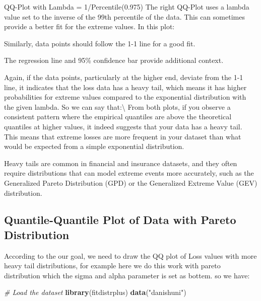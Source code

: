\documentclass[
  12pt,
]{article}
\newenvironment{Shaded}{\begin{snugshade}}{\end{snugshade}}
\newcommand{\CommentTok}[1]{\textcolor[rgb]{0.56,0.35,0.01}{\textit{#1}}}
\newcommand{\FunctionTok}[1]{\textcolor[rgb]{0.13,0.29,0.53}{\textbf{#1}}}
\newcommand{\NormalTok}[1]{#1}
\newcommand{\StringTok}[1]{\textcolor[rgb]{0.31,0.60,0.02}{#1}}
\begin{document}
QQ-Plot with Lambda = 1/Percentile(0.975) The right QQ-Plot uses a
lambda value set to the inverse of the 99th percentile of the data. This
can sometimes provide a better fit for the extreme values. In this plot:

Similarly, data points should follow the 1-1 line for a good fit.

The regression line and 95\% confidence bar provide additional context.

Again, if the data points, particularly at the higher end, deviate from
the 1-1 line, it indicates that the loss data has a heavy tail, which
means it has higher probabilities for extreme values compared to the
exponential distribution with the given lambda. So we can say
that:\textbackslash{} From both plots, if you observe a consistent
pattern where the empirical quantiles are above the theoretical
quantiles at higher values, it indeed suggests that your data has a
heavy tail. This means that extreme losses are more frequent in your
dataset than what would be expected from a simple exponential
distribution.

Heavy tails are common in financial and insurance datasets, and they
often require distributions that can model extreme events more
accurately, such as the Generalized Pareto Distribution (GPD) or the
Generalized Extreme Value (GEV) distribution.

\subsection{Quantile-Quantile Plot of Data with Pareto
Distribution}\label{quantile-quantile-plot-of-data-with-pareto-distribution}

According to the our goal, we need to draw the QQ plot of Loss values
with more heavy tail distributions, for example here we do this work
with pareto distribution which the sigma and alpha parameter is set as
bottem. so we have:

\begin{Shaded}
\begin{Highlighting}[]
\CommentTok{\# Load the dataset}
\FunctionTok{library}\NormalTok{(fitdistrplus)}
\FunctionTok{data}\NormalTok{(}\StringTok{"danishuni"}\NormalTok{)}
\end{Highlighting}
\end{Shaded}
\end{document}
